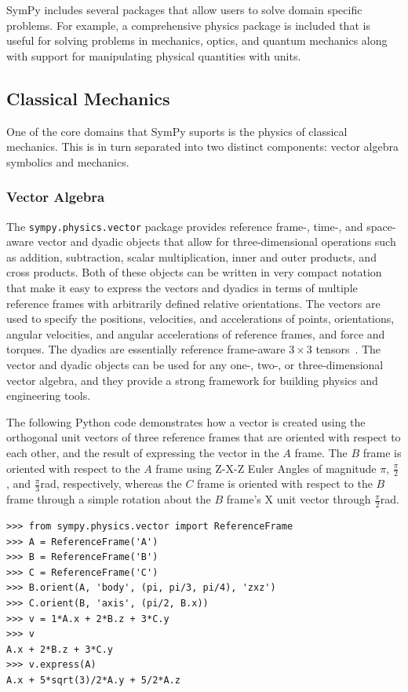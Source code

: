 SymPy includes several packages that allow users to solve domain specific
problems. For example, a comprehensive physics package is included that is
useful for solving problems in mechanics, optics, and quantum
mechanics along with support for manipulating physical quantities with units.


\subsection{Classical Mechanics}
One of the core domains that SymPy suports is the physics of classical
mechanics. This is in turn separated into two distinct components:
vector algebra symbolics and mechanics.

\subsubsection{Vector Algebra}

The \verb|sympy.physics.vector| package provides reference frame-, time-, and
space-aware vector and dyadic objects that allow for three-di\-men\-sional
operations such as addition, subtraction, scalar multiplication, inner and
outer products, and cross products. Both of these objects can be written in
very compact notation that make it easy to express the vectors and dyadics in
terms of multiple reference frames with arbitrarily defined relative
orientations. The vectors are used to specify the positions, velocities, and
accelerations of points, orientations, angular velocities, and angular
accelerations of reference frames, and force and torques. The dyadics are
essentially reference frame-aware $3 \times 3$ tensors~\cite{tai1997generalized}. The vector and dyadic
objects can be used for any one-, two-, or three-dimensional vector algebra, and
they provide a strong framework for building physics and engineering tools.

The following Python code demonstrates how a vector is created using
the orthogonal unit vectors of three reference frames that are oriented with
respect to each other, and the result of expressing the vector in the $A$
frame. The $B$ frame is oriented with respect to the $A$ frame using Z-X-Z
Euler Angles of magnitude $\pi$, $\frac{\pi}{2}$, and
$\frac{\pi}{3}$\si{\radian}, respectively, whereas the $C$ frame is oriented
with respect to the $B$ frame through a simple rotation about the $B$ frame's
X unit vector through $\frac{\pi}{2}$\si{\radian}.

\begin{verbatim}
>>> from sympy.physics.vector import ReferenceFrame
>>> A = ReferenceFrame('A')
>>> B = ReferenceFrame('B')
>>> C = ReferenceFrame('C')
>>> B.orient(A, 'body', (pi, pi/3, pi/4), 'zxz')
>>> C.orient(B, 'axis', (pi/2, B.x))
>>> v = 1*A.x + 2*B.z + 3*C.y
>>> v
A.x + 2*B.z + 3*C.y
>>> v.express(A)
A.x + 5*sqrt(3)/2*A.y + 5/2*A.z
\end{verbatim}

